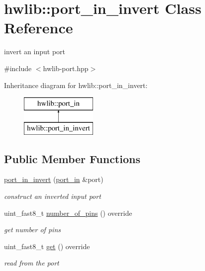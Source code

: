 \hypertarget{classhwlib_1_1port__in__invert}{}\section{hwlib\+:\+:port\+\_\+in\+\_\+invert Class Reference}
\label{classhwlib_1_1port__in__invert}


invert an input port  




{\ttfamily \#include $<$hwlib-\/port.\+hpp$>$}

Inheritance diagram for hwlib\+:\+:port\+\_\+in\+\_\+invert\+:\begin{figure}[H]
\begin{center}
\leavevmode
\includegraphics[height=2.000000cm]{classhwlib_1_1port__in__invert}
\end{center}
\end{figure}
\subsection*{Public Member Functions}
\begin{DoxyCompactItemize}
\item 
\hyperlink{classhwlib_1_1port__in__invert_afdf7f63dbf6c202b801742f50b6f5017}{port\+\_\+in\+\_\+invert} (\hyperlink{classhwlib_1_1port__in}{port\+\_\+in} \&port)
\begin{DoxyCompactList}\small\item\em construct an inverted input port \end{DoxyCompactList}\item 
uint\+\_\+fast8\+\_\+t \hyperlink{classhwlib_1_1port__in__invert_a5d05a4afd9990491daee8daa4c048faf}{number\+\_\+of\+\_\+pins} () override
\begin{DoxyCompactList}\small\item\em get number of pins \end{DoxyCompactList}\item 
uint\+\_\+fast8\+\_\+t \hyperlink{classhwlib_1_1port__in__invert_a3100bd433a45e903894f5971ac958459}{get} () override
\begin{DoxyCompactList}\small\item\em read from the port \end{DoxyCompactList}\end{DoxyCompactItemize}


